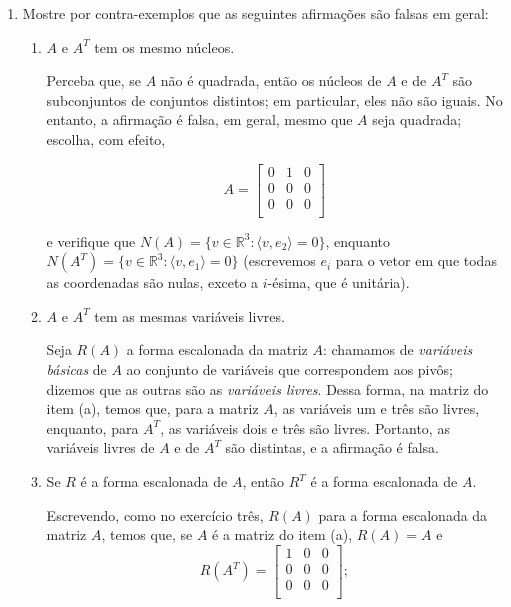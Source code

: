 \documentclass[leqno]{article}
\begin{document}
\begin{enumerate}
    \item Mostre por contra-exemplos que as seguintes afirmações são falsas em geral:

        \begin{enumerate}

            \item $A$ e $A^T$ tem os mesmo núcleos.
	    
	    \begin{sol} 
	    	Perceba que, se $A$ não é quadrada, então os núcleos de $A$ e de $A^{T}$ são subconjuntos de conjuntos distintos; em particular, eles não são iguais. No entanto, a afirmação é falsa, em geral, mesmo que $A$ seja quadrada; escolha, com efeito, 

		\begin{equation*} 
			A = 
			\begin{bmatrix} 
				0 & 1 & 0 \\ 
				0 & 0 & 0 \\ 
				0 & 0 & 0 \\ 
			\end{bmatrix}  
		\end{equation*} 

		\noindent e verifique que $N(A) = \{v \in \mathbb{R}^{3} : \langle v, e_{2} \rangle = 0\}$, enquanto $N(A^{T}) = \{v \in \mathbb{R}^{3} : \langle v, e_{1} \rangle = 0\}$ (escrevemos $e_{i}$ para o vetor em que todas as coordenadas são nulas, exceto a $i$-ésima, que é unitária).  
	    \end{sol} 

            \item $A$ e $A^T$ tem as mesmas variáveis livres.
	    
	    \begin{sol} 
		    Seja $R(A)$ a forma escalonada da matriz $A$: chamamos de \textit{variáveis básicas} de $A$ ao conjunto de variáveis que correspondem aos pivôs; dizemos que as outras são as \textit{variáveis livres}. Dessa forma, na matriz do item (a), temos que, para a matriz $A$, as variáveis um e três são livres, enquanto, para $A^{T}$, as variáveis dois e três são livres. Portanto, as variáveis livres de $A$ e de $A^{T}$ são distintas, e a afirmação é falsa.  
	    \end{sol} 

            \item Se $R$ é a forma escalonada de $A$, então $R^T$ é a forma escalonada de $A$.
	    
	    \begin{sol} 
	    	Escrevendo, como no exercício três, $R(A)$ para a forma escalonada da matriz $A$, temos que, se $A$ é a matriz do item (a), $R(A) = A$ e 
		\begin{equation*} 
			R(A^{T}) 
			= 
			\begin{bmatrix} 
				1 & 0 & 0 \\ 
				0 & 0 & 0 \\ 
				0 & 0 & 0 \\ 
			\end{bmatrix}; 
		\end{equation*} 



\end{sol}
\end{enumerate}
\end{enumerate}
\end{document}
